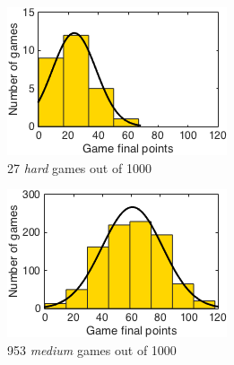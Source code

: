 \begin{figure}[h]
        \centering
        \begin{subfigure}[h]{0.32\textwidth}
                \includegraphics[width=\textwidth]{./img/appendix/histDhard}
                \caption{27 \emph{hard} games out of 1000}
                \label{app:histDhard}
        \end{subfigure}
        \begin{subfigure}[h]{0.32\textwidth}
                \includegraphics[width=\textwidth]{./img/appendix/histDmedium}
                \caption{953 \emph{medium} games out of 1000}
                \label{app:histDmedium}
        \end{subfigure}
        \begin{subfigure}[h]{0.32\textwidth}

\end{subfigure}
\end{figure}
